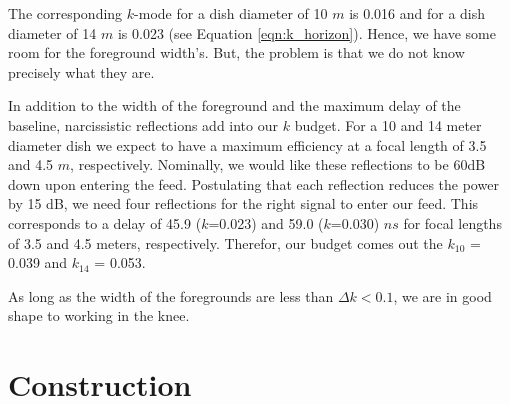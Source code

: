 \documentclass[11pt]{article}
\begin{document}
The corresponding $k$-mode for a dish diameter of 10 $m$ is 0.016 and for a dish
diameter of 14 $m$ is 0.023 (see Equation \ref{eqn:k_horizon}). Hence, we have
some room for the foreground width's. But, the problem is that we do not know
precisely what they are. 

In addition to the width of the foreground and the maximum delay of the
baseline, narcissistic reflections add into our $k$ budget. For a 10 and 14 meter
diameter dish we expect to have a maximum efficiency at a focal length of 3.5
and 4.5 $m$, respectively. Nominally, we would like these reflections to be 60dB
down upon entering the feed. Postulating that each reflection reduces the power
by 15 dB, we need four reflections for the right signal to enter our feed. This
corresponds to a delay of 45.9 ($k$=0.023)  and 59.0 ($k$=0.030) $ns$ for focal
lengths of 3.5 and 4.5 meters, respectively. Therefor, our budget comes out the
$k_{10}$ = 0.039 and $k_{14}$ = 0.053.

As long as the width of the foregrounds are less than $\Delta k < 0.1$, we are
in good shape to working in the knee. 


\section{Construction}
\end{document}
